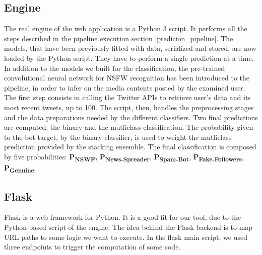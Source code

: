 \subsection{Engine}
The real engine of the web application is a Python 3 script. It performs all the steps described in the pipeline execution section \ref{predicion_pipeline}.
The models, that have been previously fitted with data, serialized and stored, are now loaded by the Python script. They have to perform a single prediction at a time.
In addition to the models we built for the classification, the pre-trained convolutional neural network for NSFW recognition has been introduced to the pipeline, in order to infer on the media contents posted by the examined user.
The first step consists in calling the Twitter APIs to retrieve user's data and its most recent tweets, up to 100. 
The script, then, handles the preprocessing stages and the data preparations needed by the different classifiers.
Two final predictions are computed: the binary and the mutliclass classification.
The probability given to the bot target, by the binary classifier, is used to weight the mutliclass prediction provided by the stacking ensemble.
The final classification is composed by five probabilities: \textbf{P\textsubscript{NSWF},} \textbf{P\textsubscript{News-Spreader}}, \textbf{P\textsubscript{Spam-Bot}}, \textbf{P\textsubscript{Fake-Followers}}, \textbf{P\textsubscript{Genuine}}.
\subsection{Flask}
Flask is a web framework for Python. It is a good fit for our tool, due to the Python-based script of the engine.
The idea behind the Flask backend is to map URL paths to some logic we want to execute. In the flask main script, we used three endpoints to trigger the computation of some code.

